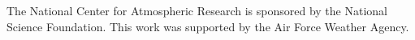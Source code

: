 \documentclass[12pt]{article}
\begin{document}
\begin{acknowledgment}
The National Center for Atmospheric Research is sponsored by the National
Science Foundation.  This work was supported by the Air Force Weather Agency.
\end{acknowledgment}








{}
{\clearpage}


\end{document}
